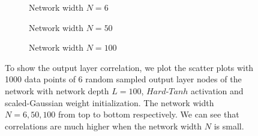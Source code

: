 \begin{figure}
\centering
\newcommand{\myWidth}{.95\textwidth}
\begin{subfigure}{\myWidth}
  \centering
  \caption{Network width $N=6$}
  \label{fig:sec4_sim1_a}
\end{subfigure}%

\begin{subfigure}{\myWidth}
  \centering
  \caption{Network width $N=50$}
  \label{fig:sec4_sim1_b}
\end{subfigure}%

\begin{subfigure}{\myWidth}
  \centering
  \caption{Network width $N=100$}
  \label{fig:sec4_sim1_c}
\end{subfigure}%

\caption[Scatter plots of output layer nodes.]{To show the output layer correlation, we plot the scatter plots with 1000 data points of 6 random sampled output layer nodes of the network with network depth $L=100$, $Hard\text{-}Tanh$ activation and scaled-Gaussian weight initialization. The network width $N=6, 50, 100$ from top to bottom respectively. We can see that correlations are much higher when the network width $N$ is small.}
\label{fig:sec4_sim1}
\end{figure}